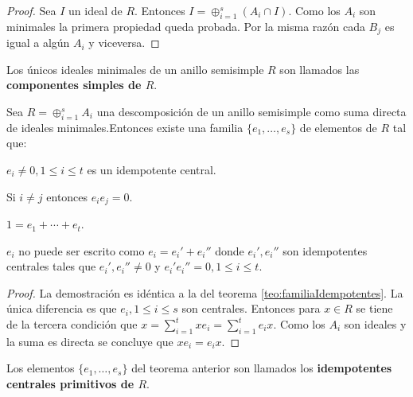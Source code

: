 \begin{proof}
Sea $I$ un ideal de $R$. Entonces $I = \oplus_{i = 1}^{s}(A_i \cap I)$. Como los $A_i$ son minimales la primera propiedad queda probada. Por la misma razón cada $B_j$ es igual a algún $A_i$ y viceversa. 
\end{proof}
\begin{definicion}
Los únicos ideales minimales de un anillo semisimple $R$ son llamados las \textbf{componentes simples de $R$}. 
\end{definicion}
\begin{teorema}
Sea $R = \oplus_{i = 1}^sA_i$ una descomposición de un anillo semisimple como suma directa de ideales minimales.Entonces existe una familia $\{e_1, \dots, e_s \}$ de elementos de $R$ tal que:
\begin{bulletList}
\item $e_i \neq 0, 1\leq i  \leq t$ es un idempotente central.
\item Si $i \neq j$ entonces $e_ie_j = 0$.
\item $1 = e_1 + \cdots + e_t$.
\item $e_i$ no puede ser escrito como $e_i = e_i'+e_i''$ donde $e_i', e_i''$ son idempotentes centrales tales que $e_i',e_i'' \neq 0$ y $e_i'e_i'' = 0, 1\leq i \leq t$.
\end{bulletList}
\end{teorema}
\begin{proof}
La demostración es idéntica a la del teorema \ref{teo:familiaIdempotentes}. La única diferencia es que $e_i, 1\leq i \leq s$ son centrales. Entonces para $x \in R$ se tiene de la tercera condición que $x = \sum_{i=1}^{t}xe_i = \sum_{i=1}^{t}e_ix$. Como los $A_i$ son ideales y la suma es directa se concluye que $xe_i = e_ix$.
\end{proof}
\begin{definicion}
Los elementos $\{ e_1, \dots, e_s \}$ del  teorema anterior son llamados los \textbf{idempotentes centrales primitivos de $R$}.
\end{definicion}
